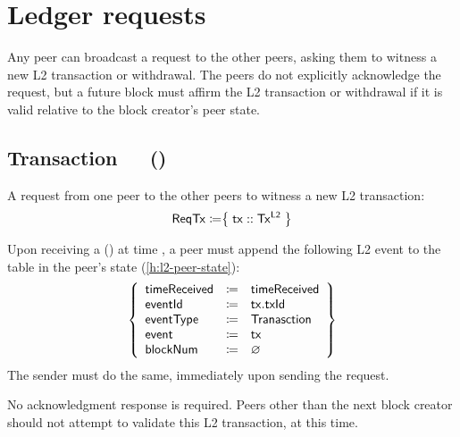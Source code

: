 \documentclass[../hydrozoa.tex]{subfiles}
\begin{document}


\section{Ledger requests}%
\label{h:l2-consensus-ledger}%

Any peer can broadcast a request to the other peers, asking them to witness a new L2 transaction or withdrawal.
The peers do not explicitly acknowledge the request, but a future block must affirm the L2 transaction or withdrawal if it is valid relative to the block creator's peer state.

\subsection{Transaction~~~()}%
\label{h:l2-consensus-transaction}%

A request from one peer to the other peers to witness a new L2 transaction:
\begin{equation*}
  \mathsf{ReqTx} \coloneq \bigr\{\; \mathsf{tx} :: \mathsf{Tx^{L2}} \;\bigr\}
\end{equation*}

Upon receiving a () at time , a peer must append the following L2 event to the  table in the peer's state (\cref{h:l2-peer-state}):
\begin{equation*}
  \left\{
  \begin{array}{lll}
    \mathsf{timeReceived} &\coloneq& \mathsf{timeReceived} \\
    \mathsf{eventId} &\coloneq& \mathsf{tx.txId} \\
    \mathsf{eventType} &\coloneq& \mathsf{Tranasction} \\
    \mathsf{event} &\coloneq& \mathsf{tx} \\
    \mathsf{blockNum} &\coloneq& \varnothing
  \end{array}\right\}
\end{equation*}
The sender must do the same, immediately upon sending the request.

No acknowledgment response is required.
Peers other than the next block creator should not attempt to validate this L2 transaction, at this time.
\end{document}
